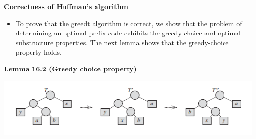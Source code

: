\documentclass{report}
\begin{document}
\textbf{Correctness of Huffman's algorithm}
\begin{itemize}
    \item To prove that the greedt algorithm is correct, we show that the problem of determining an optimal prefix code exhibits the greedy-choice and optimal-substructure properties. The next lemma shows that the greedy-choice property holds.
\end{itemize}
\textbf{Lemma 16.2 (Greedy choice property)}
\begin{center}
    \includegraphics{../entities/fig_16_6.png}
\end{center}
\end{document}
